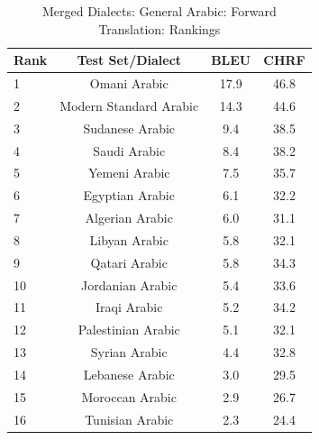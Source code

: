 \begin{table}[htbp]
\centering
\caption{Merged Dialects: General Arabic: Forward Translation: Rankings}
\label{tab:testset_ranking_forward_merged_arabic_general}
\begin{tabular}{l@{\hspace{3pt}}c@{\hspace{3pt}}c@{\hspace{3pt}}c}
\toprule
Rank & Test Set/Dialect & BLEU & CHRF \\
\midrule
1 & Omani Arabic & 17.9 & 46.8 \\
2 & Modern Standard Arabic & 14.3 & 44.6 \\
3 & Sudanese Arabic & 9.4 & 38.5 \\
4 & Saudi Arabic & 8.4 & 38.2 \\
5 & Yemeni Arabic & 7.5 & 35.7 \\
6 & Egyptian Arabic & 6.1 & 32.2 \\
7 & Algerian Arabic & 6.0 & 31.1 \\
8 & Libyan Arabic & 5.8 & 32.1 \\
9 & Qatari Arabic & 5.8 & 34.3 \\
10 & Jordanian Arabic & 5.4 & 33.6 \\
11 & Iraqi Arabic & 5.2 & 34.2 \\
12 & Palestinian Arabic & 5.1 & 32.1 \\
13 & Syrian Arabic & 4.4 & 32.8 \\
14 & Lebanese Arabic & 3.0 & 29.5 \\
15 & Moroccan Arabic & 2.9 & 26.7 \\
16 & Tunisian Arabic & 2.3 & 24.4 \\
\bottomrule
\end{tabular}
\end{table}